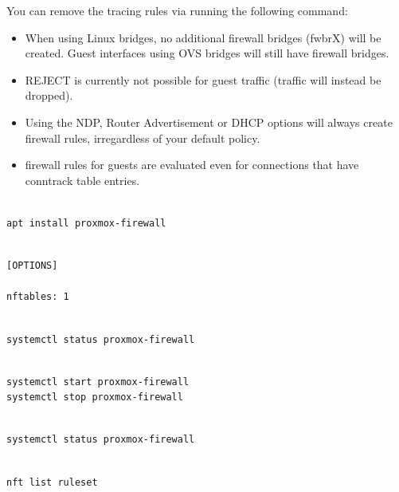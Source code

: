 You can remove the tracing rules via running the following command:

\begin{itemize}[leftmargin=2cm]

	\item When using Linux bridges, no additional firewall bridges (fwbrX) will be created. Guest interfaces using OVS bridges will still have firewall bridges.

	\item REJECT is currently not possible for guest traffic (traffic will instead be dropped).

	\item Using the NDP, Router Advertisement or DHCP options will always create firewall rules, irregardless of your default policy.

	\item firewall rules for guests are evaluated even for connections that have conntrack table entries.

\end{itemize}

\begin{lstlisting}

apt install proxmox-firewall

\end{lstlisting}

\begin{lstlisting}

[OPTIONS]

nftables: 1

\end{lstlisting}

\begin{lstlisting}

systemctl status proxmox-firewall

\end{lstlisting}

\begin{lstlisting}

systemctl start proxmox-firewall
systemctl stop proxmox-firewall

\end{lstlisting}

\begin{lstlisting}

systemctl status proxmox-firewall

\end{lstlisting}

\begin{lstlisting}

nft list ruleset

\end{lstlisting}

